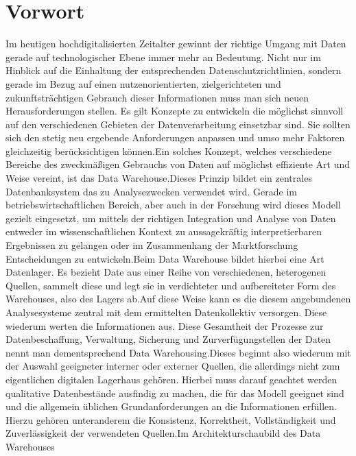 \documentclass[sigconf]{acmart}
\begin{document}

\maketitle



\section{Vorwort}
Im heutigen hochdigitalisierten Zeitalter gewinnt der richtige Umgang mit Daten gerade auf technologischer Ebene immer mehr an Bedeutung. Nicht nur im Hinblick auf die Einhaltung der entsprechenden Datenschutzrichtlinien, sondern gerade im Bezug auf einen nutzenorientierten, zielgerichteten und zukunftsträchtigen Gebrauch dieser Informationen muss man sich neuen Herausforderungen stellen. Es gilt Konzepte zu entwickeln die möglichst sinnvoll auf den verschiedenen Gebieten der Datenverarbeitung einsetzbar sind. Sie sollten sich den stetig neu ergebende Anforderungen anpassen und umso mehr Faktoren gleichzeitig berücksichtigen können.\newline Ein solches Konzept, welches verschiedene Bereiche des zweckmäßigen Gebrauchs von Daten auf möglichst effiziente Art und Weise vereint, ist das Data Warehouse.\newline Dieses Prinzip bildet ein zentrales Datenbanksystem das zu Analysezwecken verwendet wird. Gerade im betriebswirtschaftlichen Bereich, aber auch in der Forschung wird dieses Modell gezielt eingesetzt, um mittels der richtigen Integration und Analyse von Daten entweder im wissenschaftlichen Kontext zu aussagekräftig interpretierbaren Ergebnissen zu gelangen oder im Zusammenhang der Marktforschung Entscheidungen zu entwickeln.\newline Beim Data Warehouse bildet hierbei eine Art Datenlager. Es bezieht  Date aus einer Reihe von verschiedenen, heterogenen Quellen, sammelt diese und legt sie in verdichteter und aufbereiteter Form des Warehouses, also des Lagers ab.\newline Auf diese Weise kann es die diesem angebundenen Analysesysteme zentral mit dem ermittelten Datenkollektiv versorgen. Diese wiederum werten die Informationen aus. Diese Gesamtheit der Prozesse zur Datenbeschaffung, Verwaltung, Sicherung und Zurverfügungstellen der Daten nennt man dementsprechend Data Warehousing.\newline Dieses beginnt also wiederum mit der Auswahl geeigneter interner oder externer Quellen, die allerdings nicht zum eigentlichen digitalen Lagerhaus gehören. Hierbei muss darauf geachtet werden qualitative Datenbestände ausfindig zu machen, die für das Modell geeignet sind und die allgemein üblichen Grundanforderungen an die Informationen erfüllen. Hierzu gehören unteranderem die Konsistenz, Korrektheit, Vollständigkeit und Zuverlässigkeit der verwendeten Quellen.\newline Im  Architekturschaubild des Data Warehouses 
\end{document}
